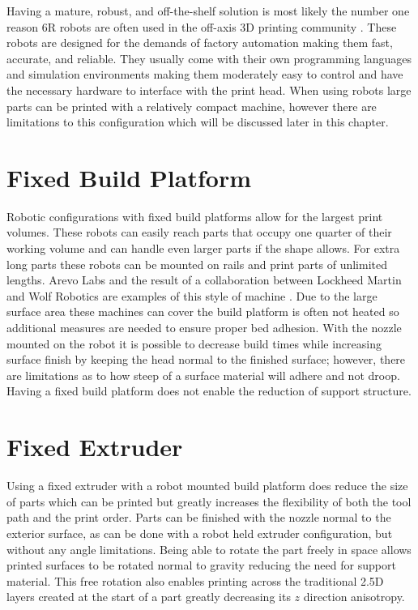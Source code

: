 \documentclass[main.tex]{subfiles}
\begin{document}
Having a mature, robust, and off-the-shelf solution is most likely the number one reason 6R robots are often used in the off-axis 3D printing community \cite{Hedges2014, Arevo2015, Vurpillat2016}. 
These robots are designed for the demands of factory automation making them fast, accurate, and reliable.
They usually come with their own programming languages and simulation environments making them moderately easy to control and have the necessary hardware to interface with the print head.
When using robots large parts can be printed with a relatively compact machine, however there are limitations to this configuration which will be discussed later in this chapter.

\section{Fixed Build Platform}
Robotic configurations with fixed build platforms allow for the largest print volumes.
These robots can easily reach parts that occupy one quarter of their working volume and can handle even larger parts if the shape allows.
For extra long parts these robots can be mounted on rails and print parts of unlimited lengths.
Arevo Labs and the result of a collaboration between Lockheed Martin and Wolf Robotics are examples of this style of machine \cite{Hedges2014, Arevo2015}.
Due to the large surface area these machines can cover the build platform is often not heated so additional measures are needed to ensure proper bed adhesion.
With the nozzle mounted on the robot it is possible to decrease build times while increasing surface finish by keeping the head normal to the finished surface; however, there are limitations as to how steep of a surface material will adhere and not droop.
Having a fixed build platform does not enable the reduction of support structure.

\section{Fixed Extruder}
Using a fixed extruder with a robot mounted build platform does reduce the size of parts which can be printed but greatly increases the flexibility of both the tool path and the print order.
Parts can be finished with the nozzle normal to the exterior surface, as can be done with a robot held extruder configuration, but without any angle limitations.
Being able to rotate the part freely in space allows printed surfaces to be rotated normal to gravity reducing the need for support material.
This free rotation also enables printing across the traditional 2.5D layers created at the start of a part greatly decreasing its $z$ direction anisotropy.
\end{document}
